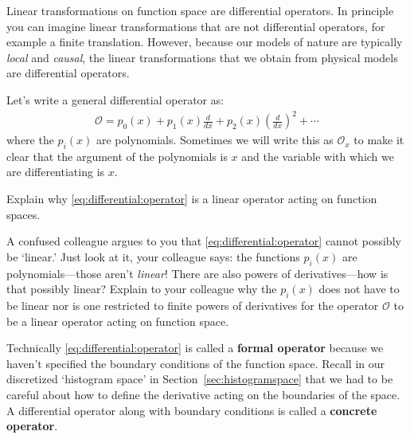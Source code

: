 Linear transformations on function space are differential operators. In principle you can imagine linear transformations that are not differential operators, for example a finite translation. However, because our models of nature are typically \emph{local} and \emph{causal}, the linear transformations that we obtain from physical models are differential operators. 

Let's write a general differential operator as:
\begin{align}
  \mathcal O = 
  p_0(x) 
  + p_1(x) \frac{d}{dx}
  + p_2(x) \left(\frac{d}{dx}\right)^2
  + \cdots
  \label{eq:differential:operator}
\end{align}
where the $p_i(x)$ are polynomials. Sometimes we will write this as $\mathcal O_x$ to make it clear that the argument of the polynomials is $x$ and the variable with which we are differentiating is $x$.  
\begin{exercise}
Explain why \eqref{eq:differential:operator} is a linear operator acting on function spaces.
\end{exercise}
\begin{exercise}
A confused colleague argues to you that \eqref{eq:differential:operator} cannot possibly be `linear.' Just look at it, your colleague says: the functions $p_i(x)$ are polynomials---those aren't \emph{linear}! There are also powers of derivatives---how is that possibly linear? Explain to your colleague why the $p_i(x)$ does not have to be linear nor is one restricted to finite powers of derivatives for the operator $\mathcal O$ to be a linear operator acting on function space.
\end{exercise}
Technically \eqref{eq:differential:operator} is called a \textbf{formal operator} because we haven't specified the boundary conditions of the function space. Recall in our discretized `histogram space' in Section~\ref{sec:histogramspace} that we had to be careful about how to define the derivative acting on the boundaries of the space. A differential operator along with boundary conditions is called a \textbf{concrete operator}.

